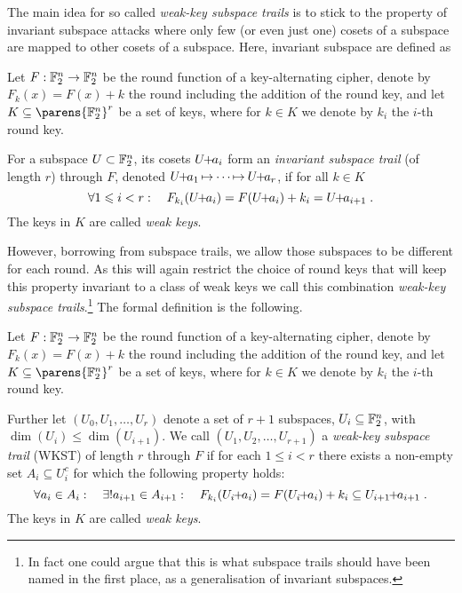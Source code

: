 The main idea for so called \emph{weak-key subspace trails} is to stick to the property of invariant subspace attacks where only few (or even just one) cosets of a subspace are mapped to other cosets of a subspace.
Here, invariant subspace are defined as
\begin{definition}\label{st:def:invariant-subspace}
    Let $F : \mathbb{F}_2^n \to \mathbb{F}_2^n$ be the round function of a key-alternating cipher, denote by $F_k(x) = F(x) + k$ the round including the addition of the round key, and let $K \subseteq \parens{\F_2^n}^r$ be a set of keys, where for $k \in K$ we denote by $k_i$ the $i$-th round key.

    For a subspace $U \subset \mathbb{F}_2^n$, its cosets $U \!\! + \!\! a_i$ form an \emph{invariant subspace trail} (of length $r$) through $F$, denoted $\propIS{\coset{U}{a_1}}{}{}{\propIS{\cdots}{}{}{\coset{U}{a_r}}}$, if for all $k \in K$
    \begin{equation*}
        \forall 1 \leqslant i < r : \quad F_{k_i}(\coset{U}{a_i}) = F(\coset{U}{a_i}) + k_i = \coset{U}{a_{i+1}}\;.
    \end{equation*}
    The keys in $K$ are called \emph{weak keys}.
\end{definition}
However, borrowing from subspace trails, we allow those subspaces to be different for each round.
As this will again restrict the choice of round keys that will keep this property invariant to a class of weak keys we call this combination \emph{weak-key subspace trails}.\footnote{%
    In fact one could argue that this is what subspace trails should have been named in the first place, as a generalisation of invariant subspaces.
}
The formal definition is the following.
\begin{definition}\label{def:wkst}
    Let $F : \mathbb{F}_2^n \to \mathbb{F}_2^n$ be the round function of a key-alternating cipher, denote by $F_k(x) = F(x) + k$ the round including the addition of the round key, and let $K \subseteq \parens{\F_2^n}^r$ be a set of keys, where for $k \in K$ we denote by $k_i$ the $i$-th round key.

    Further let $(U_0, U_1, \ldots , U_{r})$ denote a set of $r + 1$ subspaces, $U_i \subseteq \mathbb{F}_2^n$, with $\dim(U_i) \leqslant \dim (U_{i+1})$.
    We call $(U_1, U_2, \ldots , U_{r+1})$ a \emph{weak-key subspace trail} (WKST) of length $r$ through $F$ if for each $1 \leqslant i < r$ there exists a non-empty set $A_i \subseteq U_i^c$ for which the following property holds:
    \begin{equation*}
        \forall a_i \in A_i : \quad \exists! a_{i+1} \in A_{i+1} : \quad F_{k_i}(\coset{U_i}{a_i}) = F(\coset{U_i}{a_i}) + {k_i} \subseteq \coset{U_{i+1}}{a_{i+1}}\;.
    \end{equation*}
    The keys in $K$ are called \emph{weak keys}.
\end{definition}

